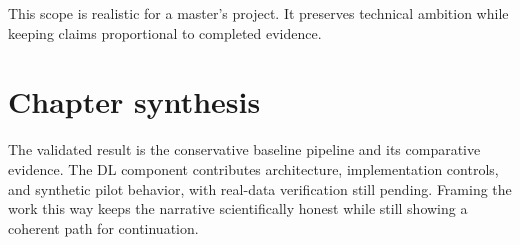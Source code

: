 This scope is realistic for a master's project. It preserves technical ambition while keeping claims proportional to completed evidence.

\section{Chapter synthesis}
The validated result is the conservative baseline pipeline and its comparative evidence. The DL component contributes architecture, implementation controls, and synthetic pilot behavior, with real-data verification still pending. Framing the work this way keeps the narrative scientifically honest while still showing a coherent path for continuation.
